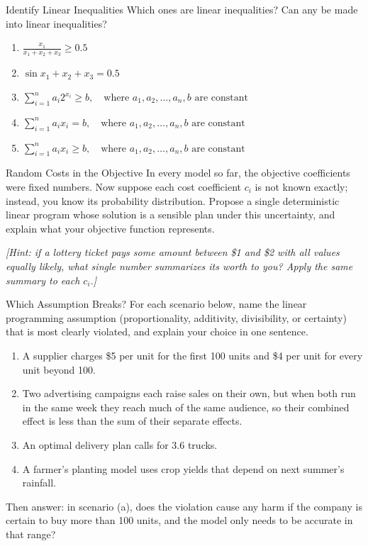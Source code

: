 
\begin{ex}{Identify Linear Inequalities}{}
\label{ex:linear-inequalities-check}
 Which ones are linear inequalities?  Can any be made into linear inequalities?

\begin{enumerate}
    \item $\frac{x_1}{x_1 + x_2 + x_3} \geq 0.5$
    \item $\sin x_1 + x_2 + x_3 = 0.5$
    \item $\sum_{i=1}^n a_i 2^{x_i} \geq b, \quad \text{where } a_1, a_2, \dots, a_n, b \text{ are constant}$
    \item $\sum_{i=1}^n a_i x_i = b, \quad \text{where } a_1, a_2, \dots, a_n, b \text{ are constant}$
    \item $\sum_{i=1}^n a_i x_i \geq b, \quad \text{where } a_1, a_2, \dots, a_n, b \text{ are constant}$
\end{enumerate}
\end{ex}

\begin{ex}{Random Costs in the Objective}{}
 In every model so far, the objective coefficients were fixed numbers.  Now suppose each cost coefficient $c_i$ is not known exactly; instead, you know its probability distribution.  Propose a single deterministic linear program whose solution is a sensible plan under this uncertainty, and explain what your objective function represents.

\emph{[Hint: if a lottery ticket pays some amount between \$1 and \$2 with all values equally likely, what single number summarizes its worth to you? Apply the same summary to each $c_i$.]}
\exrefs{\S\ref{sec:lp-modeling-assumptions}}
\end{ex}

\begin{ex}{Which Assumption Breaks?}{}
\label{ex:assumption-audit}
 For each scenario below, name the linear programming assumption (proportionality, additivity, divisibility, or certainty) that is most clearly violated, and explain your choice in one sentence.
\begin{enumerate}
\item A supplier charges \$5 per unit for the first 100 units and \$4 per unit for every unit beyond 100.
\item Two advertising campaigns each raise sales on their own, but when both run in the same week they reach much of the same audience, so their combined effect is less than the sum of their separate effects.
\item An optimal delivery plan calls for 3.6 trucks.
\item A farmer's planting model uses crop yields that depend on next summer's rainfall.
\end{enumerate}
Then answer: in scenario (a), does the violation cause any harm if the company is certain to buy more than 100 units, and the model only needs to be accurate in that range?
\end{ex}

